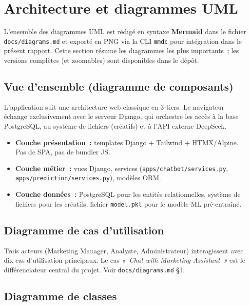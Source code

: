 \section{Architecture et diagrammes UML}
\label{sec:archi}

L'ensemble des diagrammes UML est rédigé en syntaxe \textbf{Mermaid} dans
le fichier \texttt{docs/diagrams.md} et exporté en PNG via la CLI
\texttt{mmdc} pour intégration dans le présent rapport. Cette section
résume les diagrammes les plus importants~; les versions complètes (et
zoomables) sont disponibles dans le dépôt.

\subsection{Vue d'ensemble (diagramme de composants)}

L'application suit une architecture web classique en 3-tiers. Le navigateur
échange exclusivement avec le serveur Django, qui orchestre les accès à la
base PostgreSQL, au système de fichiers (créatifs) et à l'API externe
DeepSeek.

\begin{itemize}
    \item \textbf{Couche présentation~:} templates Django + Tailwind +
    HTMX/Alpine. Pas de SPA, pas de bundler JS.
    \item \textbf{Couche métier~:} vues Django, services
    (\texttt{apps/chatbot/services.py}, \texttt{apps/prediction/services.py}),
    modèles ORM.
    \item \textbf{Couche données~:} PostgreSQL pour les entités relationnelles,
    système de fichiers pour les créatifs, fichier \texttt{model.pkl} pour
    le modèle ML pré-entraîné.
\end{itemize}

\subsection{Diagramme de cas d'utilisation}

Trois acteurs (Marketing Manager, Analyste, Administrateur) interagissent
avec dix cas d'utilisation principaux. Le cas \emph{«~Chat with Marketing
Assistant~»} est le différenciateur central du projet. Voir
\texttt{docs/diagrams.md} \S1.

\subsection{Diagramme de classes}

